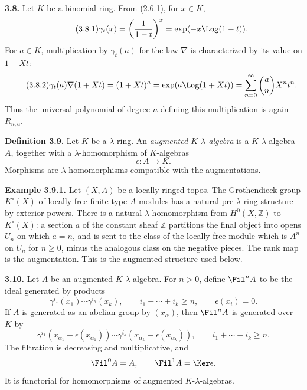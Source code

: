 \textbf{3.8.} Let \(K\) be a binomial ring. From \hyperlink{sga6.e05.eq.2-6-1}{(2.6.1)}, for \(x\in K\),
\begin{equation}\tag{3.8.1}
  \gamma_t(x)=\left(\frac1{1-t}\right)^x
  =\exp(-x\Log(1-t)).
\end{equation}
For \(a\in K\), multiplication by \(\gamma_t(a)\) for the law \(\nabla\) is characterized by its value on \(1+Xt\):
\begin{equation}\tag{3.8.2}
  \gamma_t(a)\nabla(1+Xt)
  =(1+Xt)^a
  =\exp(a\Log(1+Xt))
  =\sum_{n=0}^{\infty}\binom{a}{n}X^nt^n .
\end{equation}
Thus the universal polynomial of degree \(n\) defining this multiplication is again \(R_{n,a}\).

\textbf{Definition 3.9.} Let \(K\) be a \(\lambda\)-ring. An \emph{augmented \(K\)-\(\lambda\)-algebra} is a \(K\)-\(\lambda\)-algebra \(A\), together with a \(\lambda\)-homomorphism of \(K\)-algebras
\[
  \epsilon:A\longrightarrow K.
\]
Morphisms are \(\lambda\)-homomorphisms compatible with the augmentations.

\textbf{Example 3.9.1.} Let \((X,A)\) be a locally ringed topos. The Grothendieck group \(K^\circ(X)\) of locally free finite-type \(A\)-modules has a natural pre-\(\lambda\)-ring structure by exterior powers. There is a natural \(\lambda\)-homomorphism from \(H^0(X,\mathbb Z)\) to \(K^\circ(X)\): a section \(a\) of the constant sheaf \(\mathbb Z\) partitions the final object into opens \(U_n\) on which \(a=n\), and is sent to the class of the locally free module which is \(A^n\) on \(U_n\) for \(n\ge0\), minus the analogous class on the negative pieces. The rank map is the augmentation. This is the augmented structure used below.

\textbf{3.10.} Let \(A\) be an augmented \(K\)-\(\lambda\)-algebra. For \(n>0\), define \(\Fil^n A\) to be the ideal generated by products
\begin{equation}\tag{3.10.1}
  \gamma^{i_1}(x_1)\cdots\gamma^{i_k}(x_k),
  \qquad i_1+\cdots+i_k\ge n,
  \qquad \epsilon(x_i)=0.
\end{equation}
If \(A\) is generated as an abelian group by \((x_\alpha)\), then \(\Fil^nA\) is generated over \(K\) by
\begin{equation}\tag{3.10.2}
  \gamma^{i_1}(x_{\alpha_1}-\epsilon(x_{\alpha_1}))\cdots
  \gamma^{i_k}(x_{\alpha_k}-\epsilon(x_{\alpha_k})),
  \qquad i_1+\cdots+i_k\ge n.
\end{equation}
The filtration is decreasing and multiplicative, and
\[
  \Fil^0A=A,
  \qquad \Fil^1A=\Ker\epsilon.
\]
It is functorial for homomorphisms of augmented \(K\)-\(\lambda\)-algebras.

